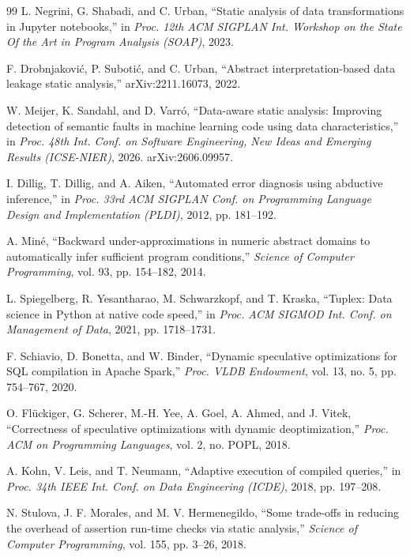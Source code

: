 \begin{thebibliography}{99}
L. Negrini, G. Shabadi, and C. Urban, ``Static analysis of data transformations in Jupyter
notebooks,'' in \emph{Proc. 12th ACM SIGPLAN Int. Workshop on the State Of the Art in Program
Analysis (SOAP)}, 2023.

F. Drobnjakovi\'c, P. Suboti\'c, and C. Urban, ``Abstract interpretation-based data leakage static
analysis,'' arXiv:2211.16073, 2022.

W. Meijer, K. Sandahl, and D. Varr\'o, ``Data-aware static analysis: Improving detection of semantic
faults in machine learning code using data characteristics,'' in \emph{Proc. 48th Int. Conf. on
Software Engineering, New Ideas and Emerging Results (ICSE-NIER)}, 2026. arXiv:2606.09957.

I. Dillig, T. Dillig, and A. Aiken, ``Automated error diagnosis using abductive inference,'' in
\emph{Proc. 33rd ACM SIGPLAN Conf. on Programming Language Design and Implementation (PLDI)}, 2012,
pp. 181--192.

A. Min\'e, ``Backward under-approximations in numeric abstract domains to automatically infer
sufficient program conditions,'' \emph{Science of Computer Programming}, vol. 93, pp. 154--182, 2014.

L. Spiegelberg, R. Yesantharao, M. Schwarzkopf, and T. Kraska, ``Tuplex: Data science in Python at
native code speed,'' in \emph{Proc. ACM SIGMOD Int. Conf. on Management of Data}, 2021,
pp. 1718--1731.

F. Schiavio, D. Bonetta, and W. Binder, ``Dynamic speculative optimizations for SQL compilation in
Apache Spark,'' \emph{Proc. VLDB Endowment}, vol. 13, no. 5, pp. 754--767, 2020.

O. Fl\"uckiger, G. Scherer, M.-H. Yee, A. Goel, A. Ahmed, and J. Vitek, ``Correctness of speculative
optimizations with dynamic deoptimization,'' \emph{Proc. ACM on Programming Languages}, vol. 2,
no. POPL, 2018.

A. Kohn, V. Leis, and T. Neumann, ``Adaptive execution of compiled queries,'' in \emph{Proc. 34th
IEEE Int. Conf. on Data Engineering (ICDE)}, 2018, pp. 197--208.

N. Stulova, J. F. Morales, and M. V. Hermenegildo, ``Some trade-offs in reducing the overhead of
assertion run-time checks via static analysis,'' \emph{Science of Computer Programming}, vol. 155,
pp. 3--26, 2018.


\end{thebibliography}
